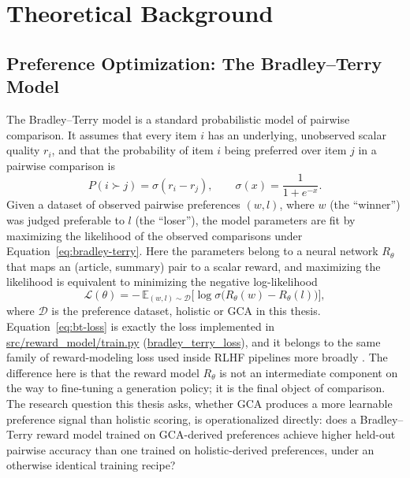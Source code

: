 \chapter{Theoretical Background}
\label{ch:background}

\section{Preference Optimization: The Bradley--Terry Model}
\label{sec:bg-bradley-terry}

The Bradley--Terry model \citep{bradley1952rank} is a standard probabilistic model
of pairwise comparison.
It assumes that every item $i$ has an underlying, unobserved scalar quality $r_i$,
and that the probability of item $i$ being preferred over item $j$ in a pairwise
comparison is
\begin{equation}
  P(i \succ j) = \sigma(r_i - r_j),
  \qquad
  \sigma(x) = \frac{1}{1 + e^{-x}}.
  \label{eq:bradley-terry}
\end{equation}
Given a dataset of observed pairwise preferences $(w, l)$, where $w$ (the
``winner'') was judged preferable to $l$ (the ``loser''), the model parameters are
fit by maximizing the likelihood of the observed comparisons under
Equation~\ref{eq:bradley-terry}. Here the parameters belong to a neural network
$R_\theta$ that maps an (article, summary) pair to a scalar reward, and maximizing
the likelihood is equivalent to minimizing the negative log-likelihood
\begin{equation}
  \mathcal{L}(\theta) = - \, \mathbb{E}_{(w, l) \sim \mathcal{D}}
  \Big[ \log \sigma\big( R_\theta(w) - R_\theta(l) \big) \Big],
  \label{eq:bt-loss}
\end{equation}
where $\mathcal{D}$ is the preference dataset, holistic or GCA in this thesis.
Equation~\ref{eq:bt-loss} is exactly the loss implemented in \url{src/reward_model/train.py}
(\url{bradley_terry_loss}), and it belongs to the same family of
reward-modeling loss used inside RLHF pipelines more broadly
\citep{stiennon2020learning, ouyang2022training}. The difference here is that the
reward model $R_\theta$ is not an intermediate component on the way to fine-tuning a
generation policy; it is the final object of comparison. The research question this
thesis asks, whether GCA produces a more learnable preference signal than holistic
scoring, is operationalized directly: does a Bradley--Terry reward model trained on
GCA-derived preferences achieve higher held-out pairwise accuracy than one trained
on holistic-derived preferences, under an otherwise identical training recipe?


